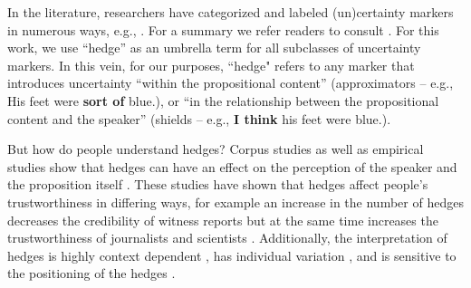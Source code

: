 \documentclass[11pt,a4paper]{article}
\newcommand{\ek}[1]{\textcolor{Orange}{[ek: #1]}}
\begin{document}
In the literature, researchers have categorized and labeled (un)certainty markers in numerous ways, e.g., \citep{lakoff1972hedges, prince1982hedging, brown1987politeness}. For a summary we refer readers to consult \cite{fraser2010pragmatic}. 
For this work, we use ``hedge'' as an umbrella term for all subclasses of uncertainty markers. In this vein, for our purposes, ``hedge" refers to any marker that introduces uncertainty ``within the propositional content'' (approximators -- e.g., His feet were \textbf{sort of} blue.), or ``in the relationship between the propositional content and the speaker'' (shields -- e.g., \textbf{I think} his feet were blue.). 

But how do people understand hedges? Corpus studies as well as empirical studies show that hedges can have an effect on the perception of the speaker and the proposition itself \citep{Erickson-etal:1978, durik2008effects, bonnefon2006tactful, rubin:2007:ShortPapers, jensen2008scientific, ferson2015natural}. These studies have shown that hedges affect people's trustworthiness in differing ways, for example an increase in the number of hedges decreases the credibility of witness reports \citep{Erickson-etal:1978} but at the same time increases the trustworthiness of journalists and scientists \citep{jensen2008scientific}. Additionally, the interpretation of hedges is highly context dependent \citep{bonnefon2006tactful,ferson2015natural}, has individual variation \citep{rubin:2007:ShortPapers,ferson2015natural}, and is sensitive to the positioning of the hedges \citep{durik2008effects}. 
\end{document}

